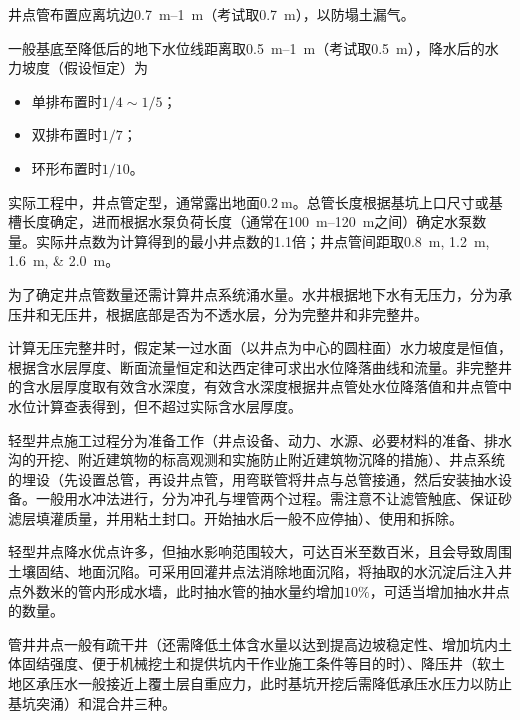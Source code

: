 \documentclass{book}
\begin{document}
\par 井点管布置应离坑边\SIrange{0.7}{1}{\m}（考试取\SI{0.7}{\m}），以防塌土漏气。
\par 一般基底至降低后的地下水位线距离取\SIrange{0.5}{1}{\m}（考试取\SI{0.5}{\m}），降水后的水力坡度（假设恒定）为
\begin{itemize}
    \item 单排布置时$1/4\sim1/5$；
    \item 双排布置时$1/7$；
    \item 环形布置时$1/10$。
\end{itemize}
\par 实际工程中，井点管定型，通常露出地面$\SI{0.2}{\m}$。总管长度根据基坑上口尺寸或基槽长度确定，进而根据水泵负荷长度（通常在\SIrange{100}{120}{\m}之间）确定水泵数量。实际井点数为计算得到的最小井点数的1.1倍；井点管间距取\SIlist{0.8;1.2;1.6;2.0}{\m}。
\par 
\par 为了确定井点管数量还需计算井点系统涌水量。水井根据地下水有无压力，分为承压井和无压井，根据底部是否为不透水层，分为完整井和非完整井。
\par 计算无压完整井时，假定某一过水面（以井点为中心的圆柱面）水力坡度是恒值，根据含水层厚度、断面流量恒定和达西定律可求出水位降落曲线和流量。非完整井的含水层厚度取有效含水深度，有效含水深度根据井点管处水位降落值和井点管中水位计算查表得到，但不超过实际含水层厚度。
\par 轻型井点施工过程分为准备工作（井点设备、动力、水源、必要材料的准备、排水沟的开挖、附近建筑物的标高观测和实施防止附近建筑物沉降的措施）、井点系统的埋设（先设置总管，再设井点管，用弯联管将井点与总管接通，然后安装抽水设备。一般用水冲法进行，分为冲孔与埋管两个过程。需注意不让滤管触底、保证砂滤层填灌质量，并用粘土封口。开始抽水后一般不应停抽）、使用和拆除。
\par 轻型井点降水优点许多，但抽水影响范围较大，可达百米至数百米，且会导致周围土壤固结、地面沉陷。可采用回灌井点法消除地面沉陷，将抽取的水沉淀后注入井点外数米的管内形成水墙，此时抽水管的抽水量约增加$10\%$，可适当增加抽水井点的数量。
\par 管井井点一般有疏干井（还需降低土体含水量以达到提高边坡稳定性、增加坑内土体固结强度、便于机械挖土和提供坑内干作业施工条件等目的时）、降压井（软土地区承压水一般接近上覆土层自重应力，此时基坑开挖后需降低承压水压力以防止基坑突涌）和混合井三种。
\end{document}

